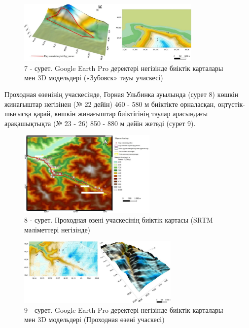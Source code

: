 \begin{figure}[H]
	\centering
	\includegraphics[width=0.8\textwidth]{media/ict2/image210}
	\caption*{7 - сурет. Google Earth Pro деректері негізінде биіктік карталары мен 3D модельдері («Зубовск» тауы учаскесі)}
\end{figure}

\begin{multicols}{2}
Проходная өзенінің учаскесінде, Горная Ульбинка ауылында (сурет 8)
көшкін жинағыштар негізінен (№ 22 дейін) 460 - 580 м биіктікте
орналасқан, оңтүстік-шығысқа қарай, көшкін жинағыштар биіктігінің таулар
арасындағы арақашықтықта (№ 23 - 26) 850 - 880 м дейін жетеді (сурет 9).
\end{multicols}

\begin{figure}[H]
	\centering
	\includegraphics[width=0.6\textwidth]{media/ict2/image211}
	\caption*{8 - сурет. Проходная өзені учаскесінің биіктік картасы (SRTM мәліметтері негізінде)}
\end{figure}

\begin{figure}[H]
	\centering
	\includegraphics[width=0.7\textwidth]{media/ict2/image212}
	\caption*{9 - сурет. Google Earth Pro деректері негізінде биіктік карталары мен 3D модельдері (Проходная өзені учаскесі)}
\end{figure}

